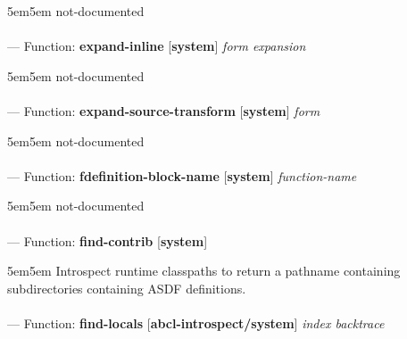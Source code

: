 \begin{adjustwidth}{5em}{5em}
not-documented
\end{adjustwidth}

\paragraph{}
\label{SYSTEM:EXPAND-INLINE}
--- Function: \textbf{expand-inline} [\textbf{system}] \textit{form expansion}

\begin{adjustwidth}{5em}{5em}
not-documented
\end{adjustwidth}

\paragraph{}
\label{SYSTEM:EXPAND-SOURCE-TRANSFORM}
--- Function: \textbf{expand-source-transform} [\textbf{system}] \textit{form}

\begin{adjustwidth}{5em}{5em}
not-documented
\end{adjustwidth}

\paragraph{}
\label{SYSTEM:FDEFINITION-BLOCK-NAME}
--- Function: \textbf{fdefinition-block-name} [\textbf{system}] \textit{function-name}

\begin{adjustwidth}{5em}{5em}
not-documented
\end{adjustwidth}

\paragraph{}
\label{SYSTEM:FIND-CONTRIB}
--- Function: \textbf{find-contrib} [\textbf{system}] \textit{}

\begin{adjustwidth}{5em}{5em}
Introspect runtime classpaths to return a pathname containing
  subdirectories containing ASDF definitions.
\end{adjustwidth}

\paragraph{}
\label{ABCL-INTROSPECT/SYSTEM:FIND-LOCALS}
--- Function: \textbf{find-locals} [\textbf{abcl-introspect/system}] \textit{index backtrace}

